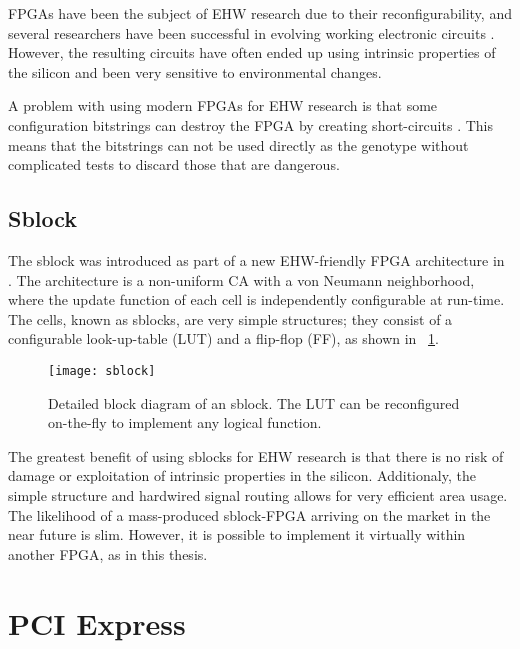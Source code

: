 FPGAs have been the subject of EHW research due to their reconfigurability, and several researchers have been successful in evolving working electronic circuits \cite{huelsbergen1998evolution, thompson1997evolved}.
However, the resulting circuits have often ended up using intrinsic properties of the silicon and been very sensitive to environmental changes.

A problem with using modern FPGAs for EHW research is that some configuration bitstrings can destroy the FPGA by creating short-circuits \cite{xapp151, ug380}.
This means that the bitstrings can not be used directly as the genotype without complicated tests to discard those that are dangerous.

\subsection{Sblock}
\label{sec:sblock}

The sblock was introduced as part of a new EHW-friendly FPGA architecture in \cite{haddow2000sblock}.
The architecture is a non-uniform CA with a von Neumann neighborhood, where the update function of each cell is independently configurable at run-time.
The cells, known as sblocks, are very simple structures; they consist of a configurable look-up-table (LUT) and a flip-flop (FF), as shown in \figurename~\ref{fig:sblock}.

\begin{figure}[!ht]
    \centering
    \texttt{[image: sblock]}
    \caption[Sblock]{
        Detailed block diagram of an sblock.
        The LUT can be reconfigured on-the-fly to implement any logical function.
    }
    \label{fig:sblock}
\end{figure}

The greatest benefit of using sblocks for EHW research is that there is no risk of damage or exploitation of intrinsic properties in the silicon.
Additionaly, the simple structure and hardwired signal routing allows for very efficient area usage.
The likelihood of a mass-produced sblock-FPGA arriving on the market in the near future is slim.
However, it is possible to implement it virtually within another FPGA, as in this thesis.


\section{PCI Express}

